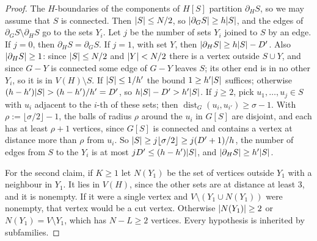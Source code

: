 \begin{proof}
The $H$-boundaries of the components of $H[S]$ partition $\partial_HS$, so we may assume that $S$ is connected. Then $\lvert S\rvert\le N/2$, so $\lvert \partial_GS\rvert\ge h\lvert S\rvert$, and the edges of $\partial_GS\setminus\partial_HS$ go to the sets $Y_i$. Let $j$ be the number of sets $Y_i$ joined to $S$ by an edge. If $j=0$, then $\partial_HS=\partial_GS$. If $j=1$, with set $Y$, then $\lvert \partial_HS\rvert\ge h\lvert S\rvert-D'$. Also $\lvert \partial_HS\rvert\ge1$: since $\lvert S\rvert\le N/2$ and $\lvert Y\rvert<N/2$ there is a vertex outside $S\cup Y$, and since $G-Y$ is connected some edge of $G-Y$ leaves $S$; its other end is in no other $Y_i$, so it is in $V(H)\setminus S$. If $\lvert S\rvert\le1/h'$ the bound $1\ge h'\lvert S\rvert$ suffices; otherwise $(h-h')\lvert S\rvert>(h-h')/h'=D'$, so $h\lvert S\rvert-D'>h'\lvert S\rvert$. If $j\ge2$, pick $u_1,\dots,u_j\in S$ with $u_i$ adjacent to the $i$-th of these sets; then $\operatorname{dist}_G(u_i,u_{i'})\ge\sigma-1$. With $\rho:=\lfloor\sigma/2\rfloor-1$, the balls of radius $\rho$ around the $u_i$ in $G[S]$ are disjoint, and each has at least $\rho+1$ vertices, since $G[S]$ is connected and contains a vertex at distance more than $\rho$ from $u_i$. So $\lvert S\rvert\ge j\lfloor\sigma/2\rfloor\ge j(D'+1)/h$, the number of edges from $S$ to the $Y_i$ is at most $jD'\le(h-h')\lvert S\rvert$, and $\lvert \partial_HS\rvert\ge h'\lvert S\rvert$.

For the second claim, if $K\ge1$ let $N(Y_1)$ be the set of vertices outside $Y_1$ with a neighbour in $Y_1$. It lies in $V(H)$, since the other sets are at distance at least $3$, and it is nonempty. If it were a single vertex and $V\setminus(Y_1\cup N(Y_1))$ were nonempty, that vertex would be a cut vertex. Otherwise $\lvert N(Y_1)\rvert\ge2$ or $N(Y_1)=V\setminus Y_1$, which has $N-L\ge2$ vertices. Every hypothesis is inherited by subfamilies.
\end{proof}

